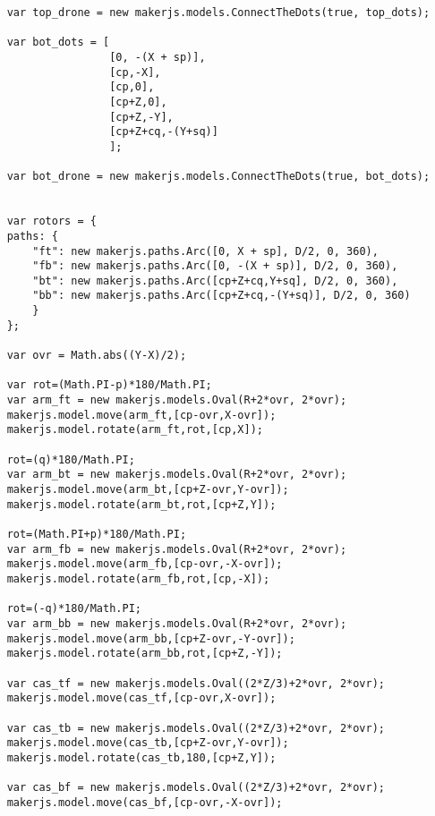 \documentclass[11pt]{article}
\begin{document}
\begin{lstlisting}
    var top_drone = new makerjs.models.ConnectTheDots(true, top_dots);
    
    var bot_dots = [
                    [0, -(X + sp)],
                    [cp,-X],
                    [cp,0],
                    [cp+Z,0],
                    [cp+Z,-Y],
                    [cp+Z+cq,-(Y+sq)]
                    ];
    
    var bot_drone = new makerjs.models.ConnectTheDots(true, bot_dots);
    
    
    var rotors = {
    paths: {
        "ft": new makerjs.paths.Arc([0, X + sp], D/2, 0, 360),
        "fb": new makerjs.paths.Arc([0, -(X + sp)], D/2, 0, 360),
        "bt": new makerjs.paths.Arc([cp+Z+cq,Y+sq], D/2, 0, 360),
        "bb": new makerjs.paths.Arc([cp+Z+cq,-(Y+sq)], D/2, 0, 360)
        }
    };
                                                                                                                        
    var ovr = Math.abs((Y-X)/2);
                       
    var rot=(Math.PI-p)*180/Math.PI;
    var arm_ft = new makerjs.models.Oval(R+2*ovr, 2*ovr);
    makerjs.model.move(arm_ft,[cp-ovr,X-ovr]);
    makerjs.model.rotate(arm_ft,rot,[cp,X]);
                                        
    rot=(q)*180/Math.PI;
    var arm_bt = new makerjs.models.Oval(R+2*ovr, 2*ovr);
    makerjs.model.move(arm_bt,[cp+Z-ovr,Y-ovr]);
    makerjs.model.rotate(arm_bt,rot,[cp+Z,Y]);
                                
    rot=(Math.PI+p)*180/Math.PI;
    var arm_fb = new makerjs.models.Oval(R+2*ovr, 2*ovr);
    makerjs.model.move(arm_fb,[cp-ovr,-X-ovr]);
    makerjs.model.rotate(arm_fb,rot,[cp,-X]);
                        
    rot=(-q)*180/Math.PI;
    var arm_bb = new makerjs.models.Oval(R+2*ovr, 2*ovr);
    makerjs.model.move(arm_bb,[cp+Z-ovr,-Y-ovr]);
    makerjs.model.rotate(arm_bb,rot,[cp+Z,-Y]);
            
    var cas_tf = new makerjs.models.Oval((2*Z/3)+2*ovr, 2*ovr);
    makerjs.model.move(cas_tf,[cp-ovr,X-ovr]);
                        
    var cas_tb = new makerjs.models.Oval((2*Z/3)+2*ovr, 2*ovr);
    makerjs.model.move(cas_tb,[cp+Z-ovr,Y-ovr]);
    makerjs.model.rotate(cas_tb,180,[cp+Z,Y]);
                            
    var cas_bf = new makerjs.models.Oval((2*Z/3)+2*ovr, 2*ovr);
    makerjs.model.move(cas_bf,[cp-ovr,-X-ovr]);
            

\end{lstlisting}
\end{document}
